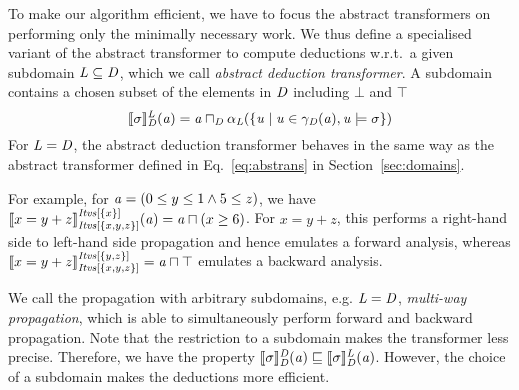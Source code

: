 To make our algorithm efficient, we have to focus the abstract
transformers on performing only the minimally necessary
work. 
%
We thus define a specialised variant of the abstract transformer to compute
deductions w.r.t.\ a given subdomain $\subdomain\subseteq \domain$,
which we call \emph{abstract deduction transformer}.
%
A subdomain contains a chosen subset of the elements in $\domain$ including $\bot$ and $\top$
\begin{equation}\label{eq:at2}
\abstrans{\domain}{\constraint}^\subdomain(\absval)=\absval\meet_\domain \alpha_\subdomain(\{\val\mid \val\in\gamma_\domain(\absval), \val\models \constraint\})
\end{equation}
For $\subdomain=\domain$, the abstract deduction transformer behaves 
in the same way as the abstract transformer defined in Eq.~\ref{eq:abstrans} 
in Section~\ref{sec:domains}.

%

%
For example, for $\absval=(0\leq y \leq 1 \wedge 5\leq z)$, we have
$\abstrans{\intervals[\{x,y,z\}]}{x=y+z}^{\intervals[\{x\}]}(\absval)=\absval\meet(x\geq
6)$. For $x=y+z$, this performs a right-hand side to left-hand side propagation and
hence emulates a forward analysis, whereas
$\abstrans{\intervals[\{x,y,z\}]}{x=y+z}^{\intervals[\{y,z\}]}=\absval\meet\top$
emulates a backward analysis.

We call the propagation with arbitrary subdomains,
e.g. $\subdomain=\domain$, \emph{multi-way propagation}, which is able
to simultaneously perform forward and backward propagation.
%
Note that the restriction to a subdomain makes the transformer less
precise. Therefore, we have the property
$\abstrans{\domain}{\constraint}^\domain(\absval)\sqsubseteq
\abstrans{\domain}{\constraint}^\subdomain(\absval)$.
However, the choice of a subdomain makes the deductions more efficient.

